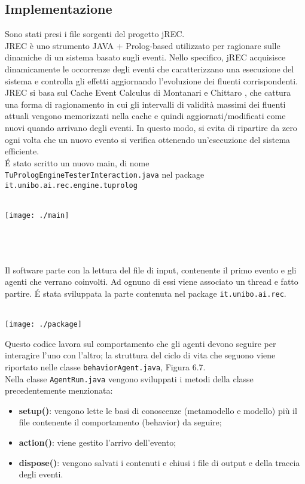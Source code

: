 \documentclass[a4paper,12pt]{report}
\begin{document}
\subsection{Implementazione}
Sono stati presi i file sorgenti del progetto jREC.\\
JREC è uno strumento JAVA + Prolog-based utilizzato per ragionare sulle dinamiche di un sistema basato sugli eventi. Nello specifico, jREC acquisisce dinamicamente le occorrenze degli eventi che caratterizzano una esecuzione del sistema e controlla gli effetti aggiornando l'evoluzione dei fluenti corrispondenti. JREC si basa sul Cache Event Calculus di Montanari e Chittaro \cite{rif9}, che cattura una forma di ragionamento in cui gli intervalli di validità massimi dei fluenti attuali vengono memorizzati nella cache e quindi aggiornati/modificati come nuovi quando arrivano degli eventi. In questo modo, si evita di ripartire da zero ogni volta che un nuovo evento si verifica ottenendo un'esecuzione del sistema efficiente.\\
\'E stato scritto un nuovo main, di nome \\\texttt{TuPrologEngineTesterInteraction.java} nel  package\\\texttt{it.unibo.ai.rec.engine.tuprolog}\\ \\
\begin{minipage}{.50\textwidth}
    \texttt{[image: ./main]}
\end{minipage}
\\ \\ \\Il software parte con la lettura del file di input, contenente il primo evento e gli agenti che verrano coinvolti. Ad ognuno di essi viene associato un thread e fatto partire.
\newpage
\'E stata sviluppata la parte contenuta nel package \texttt{it.unibo.ai.rec}.\\
\\
\begin{minipage}{.50\textwidth}
\texttt{[image: ./package]}
\end{minipage}
\begin{minipage}{.50\textwidth}
    Questo codice lavora sul comportamento che gli agenti devono seguire per interagire l'uno con l'altro; la struttura del ciclo di vita che seguono viene riportato nelle classe \texttt{behaviorAgent.java}, Figura 6.7.\\
    Nella classe \texttt{AgentRun.java} vengono sviluppati i metodi della classe precedentemente menzionata:
    \begin{itemize}
        \item \textbf{setup()}: vengono lette le basi di conoscenze (metamodello e modello) più il file contenente il comportamento (behavior) da seguire;
        \item \textbf{action()}: viene gestito l'arrivo dell'evento;
        \item \textbf{dispose()}: vengono salvati i contenuti e chiusi i file di output e della traccia degli eventi.
    \end{itemize}
\end{minipage}\\ \\ \\
\end{document}
